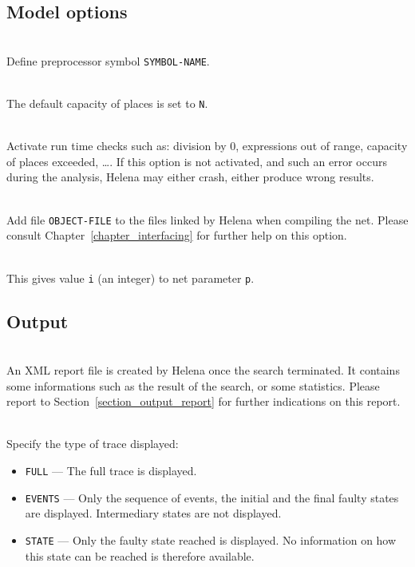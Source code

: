 \subsection{Model options}
\begin{description}
\item{}\\ Define
  preprocessor symbol \texttt{SYMBOL-NAME}.
\item{}\\ The default capacity of places is
  set to \texttt{N}.
\item{}\\ Activate run
  time checks such as: division by 0, expressions out of range,
  capacity of places exceeded, \dots. If this option is not activated,
  and such an error occurs during the analysis, Helena may either
  crash, either produce wrong results.
\item{}\\ Add file \texttt{OBJECT-FILE}
  to the files linked by Helena when compiling the net.  Please
  consult Chapter~\ref{chapter_interfacing} for further help on this
  option.
\item{}\\ This gives value \texttt{i}
  (an integer) to net parameter \texttt{p}.
\end{description}

\subsection{Output}
\begin{description}
\item{}\\ An XML report
  file is created by Helena once the search terminated.  It contains
  some informations such as the result of the search, or some
  statistics.  Please report to Section~\ref{section_output_report}
  for further indications on this report.
\item{}\\ Specify the type of trace
  displayed:
\begin{itemize}
\item\texttt{FULL} --- The full trace is displayed.
\item\texttt{EVENTS} --- Only the sequence of events, the initial and
  the final faulty states are displayed.  Intermediary states are not
  displayed.
\item\texttt{STATE} --- Only the faulty state reached is displayed.  No
  information on how this state can be reached is therefore available.
\end{itemize}
\end{description}
